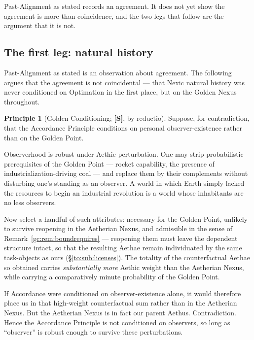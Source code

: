 \documentclass[11pt]{article}
\numberwithin{equation}{section}
\theoremstyle{plain}
\theoremstyle{definition}
\newtheorem{principle}{Principle}
\theoremstyle{remark}
\begin{document}
Past-Alignment as stated records an agreement. It does not yet show the
agreement is more than coincidence, and the two legs that follow are the
argument that it is not.

\subsection{The first leg: natural history}\label{gc:sub:conditioning}

Past-Alignment as stated is an observation about agreement. The
following argues that the agreement is not coincidental --- that
Nexic natural history was never conditioned on Optimation in the first
place, but on the Golden Nexus throughout.

\begin{principle}[Golden-Conditioning; \textbf{[S]}, by reductio]
\label{gc:prin:conditioning}
Suppose, for contradiction, that the Accordance Principle conditions on
personal observer-existence rather than on the Golden Point.

Observerhood is robust under Aethic perturbation. One may strip
probabilistic prerequisites of the Golden Point --- rocket capability,
the presence of industrialization-driving coal --- and replace them by
their complements without disturbing one's standing as an observer. A
world in which Earth simply lacked the resources to begin an industrial
revolution is a world whose inhabitants are no less observers.

Now select a handful of such attributes: necessary for the Golden Point,
unlikely to survive reopening in the Aetherian Nexus, and admissible in
the sense of Remark~\ref{gc:rem:boundrequires} --- reopening them must
leave the dependent structure intact, so that the resulting Aethae
remain individuated by the same task-objects as ours
(\S\ref{to:sub:licenses}). The totality of
the counterfactual Aethae so obtained carries \emph{substantially more}
Aethic weight than the Aetherian Nexus, while carrying a comparatively
minute probability of the Golden Point.

If Accordance were conditioned on observer-existence alone, it would
therefore place us in that high-weight counterfactual sum rather than in
the Aetherian Nexus. But the Aetherian Nexus is in fact our parent
Aethus. Contradiction. Hence the Accordance Principle is not conditioned
on observers, so long as ``observer'' is robust enough to survive these
perturbations.
\end{principle}
\end{document}
